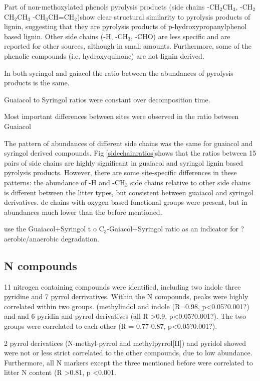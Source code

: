 \documentclass[preprint,review,12pt]{elsarticle}
\begin{document}
Part of non-methoxylated phenols pyrolysis products (side chains -CH$_2$CH$_3$, -CH$_2$CH$_2$CH$_3$ -CH$_3$CH=CH$_2$)show clear structural similarity to pyrolysis products of lignin, suggesting that they are pyrolysis products of p-hydroxypropanylphenol based lignin. Other side chains (-H, -CH$_3$, -CHO) are less specific and are reported for other sources, although in small amounts. Furthermore, some of the phenolic compounds (i.e. hydroxyquinone) are not lignin derived. 

In both syringol and gaiacol the ratio between the abundances of pyrolysis products is the same.

Guaiacol to Syringol ratios were constant over decomposition time. 

Most important differences between sites were observed in the ratio between Guaiacol

The pattern of abundances of different side chains was the same for guaiacol and syringol derived compounds. Fig \ref{sidechainratios}shows that the ratios between 15 pairs of side chains are highly significant in guaiacol and syringol lignin based pyrolysis products. However, there are some site-specific differences in these patterns: the abundance of -H and -CH$_3$ side chains relative to other side chains is different between the litter types, but consistent between guaiacol and syringol derivatives. 
  de chains with oxygen based functional groups were present, but in abundances much lower than the before mentioned. 

\cite{Kuder1998, Schellekens2009} use the Guaiacol+Syringol t o C$_3$-Gaiacol+Syringol ratio as an indicator for ?aerobic/anaerobic degradation. 

\subsection{N compounds}

11 nitrogen containing compounds were identified, including two indole three pyridine and 7 pyrrol derrivatives. Within the N compounds, peaks were highly correlated within two groups.  (methylindol and indole (R=0.98, p\textless 0.05?0.001?) and  and 6 pyridin and pyrrol derivatives (all R \textgreater 0.9, p\textless 0.05?0.001?). The two groups were correlated to each other (R = 0.77-0.87, p\textless 0.05?0.001?). 

2 pyrrol derivatices (N-methyl-pyrrol and methylpyrrol[II]) and pyridol showed were not or less strict correlated to the other compounds, due to low abundance. Furthermore, all N markers except the three mentioned before were correlated to litter N content (R \textgreater 0.81, p \textless 0.001.
\end{document}
